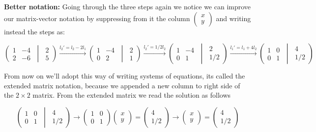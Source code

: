 \documentclass[
  letterpaper,
  DIV=11,
  numbers=noendperiod]{scrartcl}
\theoremstyle{definition}
\theoremstyle{remark}
\begin{document}
\textbf{Better notation:} Going through the three steps again we notice
we can improve our matrix-vector notation by suppressing from it the
column \(\begin{pmatrix}x\\y\end{pmatrix}\) and writing instead the
steps as:

\[
\left(\begin{matrix} 1 & -4 \\ 2 & -6 \end{matrix}\;\middle|\; \begin{matrix} 2\\5\end{matrix}\right)
\overset{l_2'=l_2-2l_1}{\longrightarrow} 
\left(\begin{matrix} 1 & -4 \\ 0 & 2 \end{matrix}\;\middle|\; \begin{matrix} 2\\1\end{matrix}\right)
\overset{l_2'=1/2l_2}{\longrightarrow}
\left(\begin{matrix} 1 & -4 \\ 0 & 1 \end{matrix}\;\middle|\; \begin{matrix} 2\\1/2\end{matrix}\right)
\overset{l_1'=l_1+4l_2}{\longrightarrow}
\left(\begin{matrix} 1 & 0 \\ 0 & 1 \end{matrix}\;\middle|\; \begin{matrix} 4\\1/2\end{matrix}\right)
\]

From now on we'll adopt this way of writing systems of equations, its
called the extended matrix notation, because we appended a new column to
right side of the \(2\times2\) matrix. From the extended matrix we read
the solution as follows

\[
\left(\begin{matrix} 1 & 0 \\ 0 & 1 \end{matrix}\;\middle|\; \begin{matrix} 4\\1/2\end{matrix}\right)\longrightarrow \begin{pmatrix} 1 & 0\\ 0 & 1 \end{pmatrix}\begin{pmatrix}x\\y\end{pmatrix}= \begin{pmatrix}4\\1/2\end{pmatrix}\longrightarrow \begin{pmatrix}x\\y\end{pmatrix}= \begin{pmatrix}4\\1/2\end{pmatrix}
\]
\end{document}

